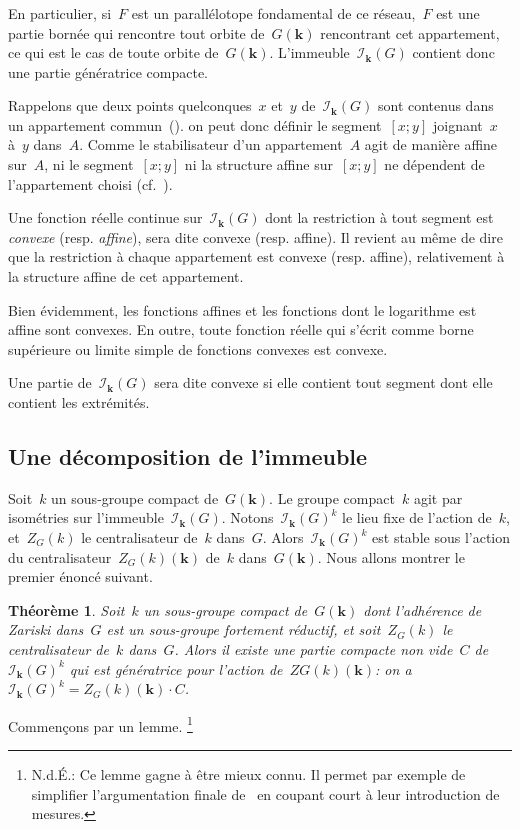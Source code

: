 \documentclass[french]{amsart}
\newcommand{\kk}{\mathbf{k}}
\newcommand{\Ik}{\mathscr{I}_\kk}
\newtheorem{theoreme}{Théorème}[section]
\begin{document}
\subsubsection{}\label{sectionF11}
En particulier, si~$F$ est un parallélotope fondamental de ce réseau,~$F$ est une partie bornée qui rencontre tout orbite de~$G(\kk)$ rencontrant cet appartement, ce qui est le cas de toute orbite de~$G(\kk)$. L'immeuble~$\Ik(G)$ contient donc une partie génératrice compacte.

Rappelons que deux points quelconques~$x$ et~$y$ de~$\Ik(G)$ sont contenus dans un appartement commun~(\cite[7.14.18]{BT72}). on peut donc définir le segment~$[x;y]$ joignant~$x$ à~$y$ dans~$A$. Comme le stabilisateur d'un appartement~$A$ agit de manière affine sur~$A$, ni le segment~$[x;y]$ ni la structure affine sur~$[x;y]$ ne dépendent de l'appartement choisi (cf.~\cite[2.2.1]{Tit79}).

\label{convexité}
Une fonction réelle continue sur~$\Ik (G)$ dont la restriction à tout segment
est \emph{con\-ve\-xe} (resp. \emph{affine}), sera dite convexe (resp. affine). Il revient au même
de dire que la restriction à chaque appartement est convexe (resp. affine),
relativement à la structure affine de cet appartement.

Bien évidemment, les fonctions affines et les fonctions dont le logarithme est
affine sont convexes. En outre, toute fonction réelle qui s'écrit comme borne
supérieure ou limite simple de fonctions convexes est convexe.

\label{convexite2}
Une partie de~$\Ik(G)$ sera dite convexe si elle contient tout segment dont elle contient les extrémités.

\subsection{Une décomposition de l'immeuble}
Soit~$k$ un sous-groupe compact de~$G(\kk)$. Le groupe compact~$k$ agit par isométries sur l'immeuble~$\Ik(G)$.
Notons~$\Ik(G)^k$ le lieu fixe de l'action de~$k$, et~$Z_G(k)$ le centralisateur de~$k$ dans~$G$.
Alors~$\Ik(G)^k$ est stable sous l'action du centralisateur~$Z_G(k)(\kk)$ de~$k$ dans~$G(\kk)$.
Nous allons montrer le premier énoncé suivant.

\begin{theoreme}\label{TheoF1}\label{propF1}
Soit~$k$ un sous-groupe compact de~$G(\kk)$ dont l'adhérence
de Zariski dans~$G$ est un sous-groupe fortement réductif, et soit~$Z_G (k)$ le centralisateur de~$k$ dans~$G$. Alors il existe une partie compacte non vide~$C$ de~$\Ik(G)^k$ qui est génératrice pour l'action de~$Z G (k)(\kk)$: on a~$\Ik(G)^k=Z_G (k)(\kk)\cdot C$.
\end{theoreme}
Commençons par un lemme. 
\footnote{N.d.É.: Ce lemme gagne à être mieux connu. Il permet par exemple de simplifier l'argumentation finale de~\cite[]{UllmoYaffaev} en coupant court à leur introduction de mesures.}
\end{document}
